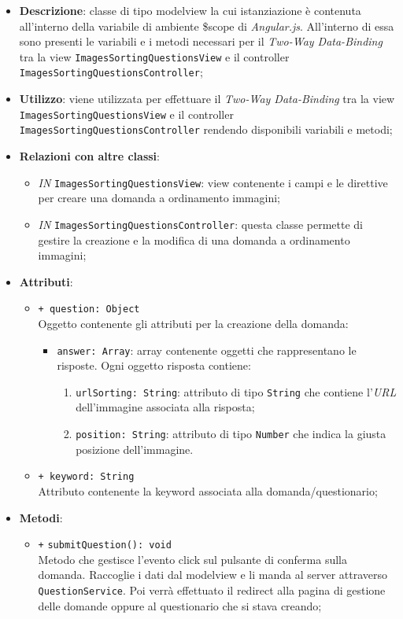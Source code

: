 \begin{itemize}
	\item \textbf{Descrizione}: classe di tipo modelview la cui istanziazione è contenuta all'interno della variabile di ambiente \$scope di \textit{Angular.js}. All'interno di essa sono presenti le variabili e i metodi necessari per il \textit{Two-Way Data-Binding} tra la view \texttt{ImagesSortingQuestionsView} e il controller \texttt{ImagesSortingQuestionsController}; 
	\item \textbf{Utilizzo}: viene utilizzata per effettuare il \textit{Two-Way Data-Binding} tra la view \texttt{ImagesSortingQuestionsView} e il controller \texttt{ImagesSortingQuestionsController} rendendo disponibili variabili e metodi;
	\item \textbf{Relazioni con altre classi}:
	\begin{itemize}
		\item \textit{IN} \texttt{ImagesSortingQuestionsView}: view contenente i campi e le direttive per creare una domanda a ordinamento immagini; 
		\item \textit{IN} \texttt{ImagesSortingQuestionsController}: questa classe permette di gestire la creazione e la modifica di una domanda a ordinamento immagini;
	\end{itemize}
	\item \textbf{Attributi}:
	\begin{itemize}
		\item \texttt{+ question: Object} \\ Oggetto contenente gli attributi per la creazione della domanda:
		\begin{itemize}
			\item \texttt{answer: Array}: array contenente oggetti che rappresentano le risposte. Ogni oggetto risposta contiene:
			\begin{enumerate}
				\item \texttt{urlSorting: String}: attributo di tipo \texttt{String} che contiene l'\textit{URL} dell'immagine associata alla risposta;
				\item \texttt{position: String}: attributo di tipo \texttt{Number} che indica la giusta posizione dell'immagine.
			\end{enumerate}
		\end{itemize}
		\item \texttt{+ keyword: String} \\ Attributo contenente la keyword associata alla domanda/questionario;	  
	\end{itemize}
	\item \textbf{Metodi}:
	\begin{itemize}
		\item \texttt{+} \texttt{submitQuestion(): void}\\ 
		Metodo che gestisce l’evento click sul pulsante di conferma sulla domanda. Raccoglie i dati dal modelview e li manda al server attraverso \texttt{QuestionService}. Poi verrà effettuato il redirect alla pagina di gestione delle domande oppure al questionario che si stava creando; 
	\end{itemize}
\end{itemize}


